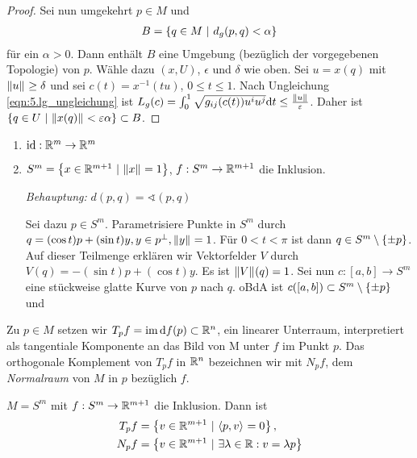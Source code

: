 \documentclass{skript}
\begin{document}
\begin{stz}
\begin{proof}
    Sei nun umgekehrt $p\in M$ und
    \begin{align}
      B = \mdef[q\in M]{d_g(p,q) < \alpha}
      \label{}
    \end{align}
    für ein $\alpha > 0$. Dann enthält $B$ eine Umgebung (bezüglich der
    vorgegebenen Topologie) von $p$. Wähle dazu $(x, U)$, $\epsilon$ und
    $\delta$ wie oben. Sei $u = x(q)$ mit $\norm u \ge \delta$ und sei $c(t) =
    x^{-1}(tu)$, $0 \le t \le 1$. Nach Ungleichung \ref{eqn:5.lg_ungleichung}
    ist $L_g(c) = \int_0^1 \sqrt{g_{ij}(c(t))u^iu^j}\d t \le
    \frac{\norm u}{\epsilon}$. Daher ist $\mdef[q\in U]{\norm{x(q)} <
    \epsilon\alpha} \subset B$.
  \end{proof}

  \begin{bsps}
    \begin{enumerate}
      \item $\operatorname{id} : \mathbb{R}^m \to \mathbb{R}^m$
      \item $S^m = \mdef[x\in \R^{m+1}]{\norm x = 1}$, $f : S^m\to\mathbb{R}^{m+1}$ die
        Inklusion.
        
        \emph{Behauptung:} $d(p,q) = \sphericalangle(p,q)$

        Sei dazu $p\in S^m$. Parametrisiere Punkte in $S^m$ durch $q = (\cos t)p
        + (\sin t)y, y\in p^\perp, \norm y = 1$. Für $0< t < \pi$ ist dann $q\in
        S^m \setminus \mdef{\pm p}$. Auf dieser Teilmenge erklären wir
        Vektorfelder $V$ durch $V(q) = -(\sin t)p + (\cos t)y$. Es ist $\norm
        V(q) = 1$. Sei nun $c:[a,b] \to S^m$ eine stückweise glatte Kurve von
        $p$ nach $q$.
        oBdA ist $c([a,b])\subset S^m\setminus\mdef{\pm p}$ und 

    \end{enumerate}
  \end{bsps}
\end{stz}

Zu $p\in M$ setzen wir $T_pf = \operatorname{im}{\mathrm d f(p)} \subset \mathbb{R}^n$, ein linearer
Unterraum, interpretiert als tangentiale Komponente an das Bild von M unter $f$
im Punkt $p$. Das orthogonale Komplement von $T_pf$ in $\mathbb{R}^n$ bezeichnen wir mit
$N_pf$, dem \emph{Normalraum} von $M$ in $p$ bezüglich $f$.

\begin{bsp}
  $M=S^m$ mit $f:S^m\to \mathbb{R}^{m+1}$ die Inklusion. Dann ist
  \begin{align*}
    T_pf &= \mdef[v\in\R^{m+1}]{\sprod{p,v}=0},\\
    N_pf &= \mdef[v\in\R^{m+1}]{\exists \lambda\in\R : v = \lambda p}
  \end{align*}
\end{bsp}
\end{document}
